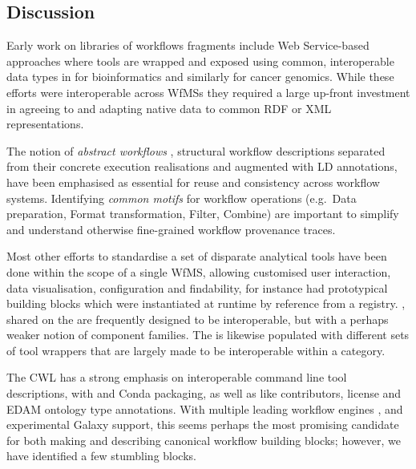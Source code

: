 \subsection{Discussion}\label{ch6:discussion}

Early work on libraries of workflows fragments include Web Service-based approaches where tools are wrapped and exposed using common, interoperable data types in  \cite{BioMoby 2008} for bioinformatics and similarly  \cite{Saltz 2006} for cancer genomics.
While these efforts were interoperable across WfMSs they required a large up-front investment in agreeing to and adapting native data to common RDF or XML representations.

The notion of \emph{abstract workflows} \cite{Garijo 2011}, structural workflow descriptions separated from their concrete execution realisations and augmented with \acrlong{LD} annotations, have been emphasised as essential for reuse and consistency across workflow systems.
Identifying \emph{common motifs} for workflow operations \cite{Garijo 2014a} (e.g.~Data preparation, Format transformation, Filter, Combine) are important to simplify and understand otherwise fine-grained workflow provenance traces.

Most other efforts to standardise a set of disparate analytical tools have been done within the scope of a single WfMS, allowing customised user interaction, data visualisation, configuration and findability, for instance  had prototypical building blocks \cite{De Giovanni 2016} which were instantiated at runtime by reference from a registry. 
, shared on the  are frequently designed to be interoperable, but with a perhaps weaker notion of component families.
The  \cite{Blankenberg 2014} is likewise populated with different sets of tool wrappers that are largely made to be interoperable within a category.

The
\acrfull{CWL}
\cite{Crusoe 2022} has a strong emphasis on interoperable command line tool descriptions, with  and Conda packaging, as well as  like contributors, license and EDAM ontology type annotations.
With multiple leading workflow engines , and experimental Galaxy support, this seems perhaps the most promising candidate for both making and describing canonical workflow building blocks; however, we have identified a few stumbling blocks.

